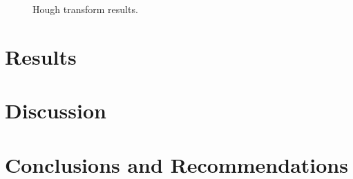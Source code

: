 \begin{figure}[H]
  \centering
  \hfill
  \caption{Hough transform results.}
  \label{fig:hough_img}
\end{figure}

\newpage
\section{Results}

\newpage
\section{Discussion}

\newpage
\section{Conclusions and Recommendations}

\newpage



\normalsize
\newpage


